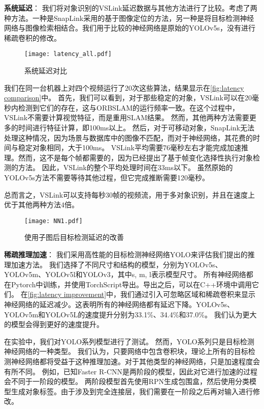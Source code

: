 \textbf{系统延迟}：
我们将对象识别的VSLink延迟数据与其他方法进行了比较。考虑了两种方法。一种是SnapLink\cite{chen2018snaplink}采用的基于图像定位的方法，另一种是将目标检测神经网络与图像检索相结合。我们用于比较的神经网络是原始的YOLOv5s\cite{glenn_jocher_2020_4154370}，没有进行稀疏卷积的修改。

\begin{figure}[htbp]
	\centering
	\texttt{[image: latency\_all.pdf]}
	\caption{系统延迟对比}
	\label{fig:latency comparison}
\end{figure}

我们在同一台机器上对四个视频运行了20次这些算法，结果显示在\autoref{fig:latency comparison}中。
首先，我们可以看到，对于那些稳定的对象，VSLink可以在20毫秒内检测到它们的存在，这与ORBSLAM的运行频率一致。在这个过程中，VSLink不需要计算视觉特征，而是重用SLAM结果。
然而，其他两种方法需要更多的时间进行特征计算，即100ms以上。
然后，对于可移动对象，SnapLink无法处理这种情况，因为场景与数据库中的图像不匹配，而对于神经网络，其花费的时间与稳定对象相同，大于100ms。
VSLink平均需要76毫秒左右才能完成加速推理。然而，这不是每个帧都需要的，因为\cite{yao2020video}已经提出了基于帧变化选择性执行对象检测的方法。
因此，VSLink的整个平均处理时间在33ms以下。
虽然原始的YOLOv5s方法不需要等待其他过程，但它完成推断需要120毫秒。
 
总而言之，VSLink可以支持每秒30帧的视频流，用于多对象识别，并且在速度上优于其他两种方法$4$倍。

\begin{figure}[htbp]
	\centering
	\texttt{[image: NN1.pdf]}
	\caption{使用子图后目标检测延迟的改善}
	\label{fig:latency improvement}
\end{figure}

\textbf{稀疏推理加速}：
我们采用高性能的目标检测神经网络YOLO\cite{redmon2016you}来评估我们提出的推理加速方法。
我们选择了不同尺寸和结构的模型，分别为YOLOv5s、YOLOv5m、YOLOv5l和YOLOv3，其中s, m, l表示模型尺寸。
所有神经网络都在Pytorch中训练，并使用TorchScript导出。导出之后，可以在C++环境中调用它们。
在\autoref{fig:latency improvement}中，我们通过引入可忽略区域和稀疏卷积来显示神经网络的延迟减少。这表明所有的神经网络都有延迟下降。YOLOv5s、YOLOv5m和YOLOv5L的速度提升分别为33.1\%、34.4\%和37.0\%。
我们认为更大的模型会得到更好的速度提升。

在实验中，我们对YOLO系列模型进行了测试。
然而，YOLO系列只是目标检测神经网络的一种类型。
我们认为，只要网络中包含卷积块，理论上所有的目标检测神经网络都将受益于这种推理加速。对于其他类型的神经网络，只是加速程度会有所不同。
例如，已知Faster R-CNN是两阶段的模型，因此对它进行加速的过程会不同于一阶段的模型。
两阶段模型首先使用RPN生成包围盒，然后使用分类模型生成对象标签。由于涉及到完全连接层，我们需要在一阶段之后再对输入进行修改。


